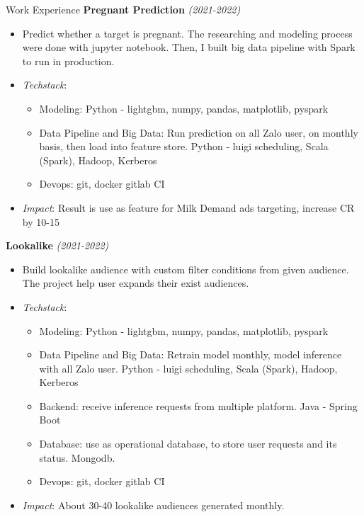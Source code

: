 \documentclass{resume} %
\begin{document}
\begin{rSection}{Work Experience}
\textbf{Pregnant Prediction } \textit{(2021-2022)}
\begin{itemize}
    \item Predict whether a target is pregnant. The researching and modeling process were done with jupyter notebook. Then, I built big data pipeline with Spark to run in production.
    \item \textit{Techstack}:
    \begin{itemize}
        \item Modeling: Python - lightgbm, numpy, pandas, matplotlib, pyspark
        \item Data Pipeline and Big Data: Run prediction on all Zalo user, on monthly basis, then load into feature store. Python - luigi scheduling, Scala (Spark), Hadoop, Kerberos
        \item Devops: git, docker gitlab CI
    \end{itemize} 
    \item \textit{Impact}: Result is use as feature for Milk Demand ads targeting, increase CR by 10-15%
\end{itemize}

\textbf{Lookalike} \textit{(2021-2022)}
\begin{itemize}
    \item Build lookalike audience with custom filter conditions from given audience. The project help user expands their exist audiences.
    \item \textit{Techstack}:
    \begin{itemize}
        \item Modeling: Python - lightgbm, numpy, pandas, matplotlib, pyspark
        \item Data Pipeline and Big Data: Retrain model monthly,  model inference with all Zalo user. Python - luigi scheduling, Scala (Spark), Hadoop, Kerberos
        \item Backend: receive inference requests from multiple platform. Java - Spring Boot
        \item Database: use as operational database, to store user requests and its status. Mongodb.
        \item Devops: git, docker gitlab CI
    \end{itemize} 
    \item \textit{Impact}: About 30-40 lookalike audiences generated monthly.
\end{itemize}



\end{rSection}
\end{document}
